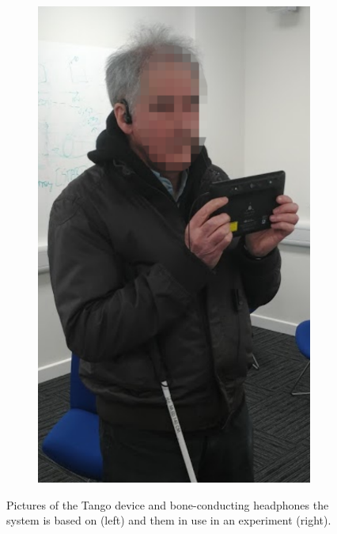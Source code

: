 \documentclass[sigconf, screen=true, anonymous=true]{acmart}
\begin{document}
\begin{figure}
\begin{subfigure}[t]{0.5\columnwidth}
    \includegraphics[width=0.7\columnwidth]{figures/vi_participant.pdf}
    \caption{}\label{fig:participant}
  \end{subfigure}
  \caption{Pictures of the Tango device and bone-conducting headphones the system is based on (left) and them in use in an experiment (right).}
\end{figure}
\end{document}
